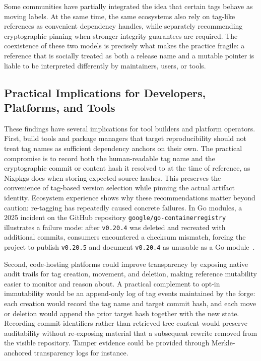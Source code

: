 Some communities have partially integrated the idea that certain tags behave as moving labels.
At the same time, the same ecosystems also rely on tag-like references as convenient dependency handles, while separately recommending cryptographic pinning when stronger integrity guarantees are required.
The coexistence of these two models is precisely what makes the practice fragile: a reference that is socially treated as both a release name and a mutable pointer is liable to be interpreted differently by maintainers, users, or tools.

\subsection{Practical Implications for Developers, Platforms, and Tools}
\label{subsec:tags-disc-practical}

These findings have several implications for tool builders and platform operators.
First, build tools and package managers that target reproducibility should not treat tag names as sufficient dependency anchors on their own.
The practical compromise is to record both the human-readable tag name and the cryptographic commit or content hash it resolved to at the time of reference, as Nixpkgs does when storing expected source hashes.
This preserves the convenience of tag-based version selection while pinning the actual artifact identity.
Ecosystem experience shows why these recommendations matter beyond caution: re-tagging has repeatedly caused concrete failures.
In Go modules, a 2025 incident on the GitHub repository \texttt{google/go-containerregistry} illustrates a failure mode: after \texttt{v0.20.4} was deleted and recreated with additional commits, consumers encountered a checksum mismatch, forcing the project to publish \texttt{v0.20.5} and document \texttt{v0.20.4} as unusable as a Go module~\cite{go_containerregistry_retagging_issue}.

Second, code-hosting platforms could improve transparency by exposing native audit trails for tag creation, movement, and deletion, making reference mutability easier to monitor and reason about.
A practical complement to opt-in immutability would be an append-only log of tag events maintained by the forge: each creation would record the tag name and target commit hash, and each move or deletion would append the prior target hash together with the new state.
Recording commit identifiers rather than retrieved tree content would preserve auditability without re-exposing material that a subsequent rewrite removed from the visible repository.
Tamper evidence could be provided through Merkle-anchored transparency logs for instance.

